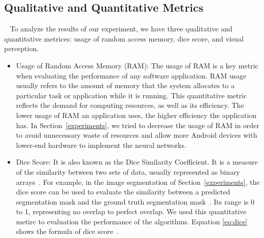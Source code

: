 \documentclass[runningheads]{llncs}
\begin{document}
\subsection{Qualitative and Quantitative Metrics}~\label{metrics}
To analyze the results of our experiment, we have three qualitative and quantitative metrices: usage of random access memory, dice score, and visual perception.
\begin{itemize}
	\item Usage of Random Access Memory (RAM): The usage of RAM is a key metric when evaluating the performance of any software application. RAM usage usually refers to the amount of memory that the system allocates to a particular task or application while it is running. This quantitative metric reflects the demand for computing resources, as well as its efficiency. The lower usage of RAM an application uses, the higher efficiency the application has. In Section~\ref{experiments}, we tried to decrease the usage of RAM in order to avoid unnecessary waste of resources and allow more Android devices with lower-end hardware to implement the neural networks.
	\item Dice Score: It is also known as the Dice Similarity Coefficient. It is a measure of the similarity between two sets of data, usually represented as binary arrays~\cite{dicescore2023}. For example, in the image segmentation of Section~\ref{experiments}, the dice score can be used to evaluate the similarity between a predicted segmentation mask and the ground truth segmentation mask~\cite{dicescore2023}. Its range is 0 to 1, representing no overlap to perfect overlap. We used this quantitative metirc to evaluation the performance of the algorithms. Equation \eqref{eq:dice} shows the formula of dice score~\cite{yerram2020dice}.
	

\end{itemize}
\end{document}
